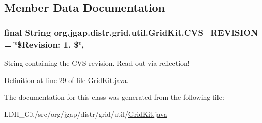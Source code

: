 \subsection{Member Data Documentation}
\hypertarget{classorg_1_1jgap_1_1distr_1_1grid_1_1util_1_1_grid_kit_a84c725af08ec5d6544cbce8e7658e023}{
\subsubsection[{C\-V\-S\-\_\-\-R\-E\-V\-I\-S\-I\-O\-N}]{\setlength{\rightskip}{0pt plus 5cm}final String org.\-jgap.\-distr.\-grid.\-util.\-Grid\-Kit.\-C\-V\-S\-\_\-\-R\-E\-V\-I\-S\-I\-O\-N = \char`\"{}\$Revision\-: 1. \$\char`\"{}\hspace{0.3cm}{\ttfamily [static]}, {\ttfamily [private]}}}\label{classorg_1_1jgap_1_1distr_1_1grid_1_1util_1_1_grid_kit_a84c725af08ec5d6544cbce8e7658e023}
String containing the C\-V\-S revision. Read out via reflection! 

Definition at line 29 of file Grid\-Kit.\-java.



The documentation for this class was generated from the following file\-:\begin{DoxyCompactItemize}
\item 
L\-D\-H\-\_\-\-Git/src/org/jgap/distr/grid/util/\hyperlink{_grid_kit_8java}{Grid\-Kit.\-java}\end{DoxyCompactItemize}
